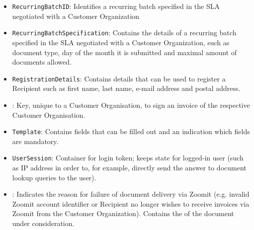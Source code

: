 \begin{itemize}
	\item \texttt{RecurringBatchID}: Identifies a recurring batch specified in the SLA negotiated with a Customer Organization
	\item \texttt{RecurringBatchSpecification}: Contains the details of a recurring batch specified in the SLA negotiated with a Customer Organization, such as document type, day of the month it is submitted and maximal amount of documents allowed.
	\item \texttt{RegistrationDetails}: Contains details that can be used to register a Recipient such as first name, last name, e-mail address and postal address.
	\item {}: Key, unique to a Customer Organisation, to sign an invoice of the respective Customer Organisation.
	\item \texttt{Template}: Contains fields that can be filled out and an indication which fields are mandatory.
	\item \texttt{UserSession}: Container for login token; keeps state for logged-in user (such as IP address in order to, for example, directly send the answer to document lookup queries to the user).
	\item {}: Indicates the reason for failure of document delivery via Zoomit (e.g. invalid Zoomit account identifier or Recipient no longer wishes to receive invoices via Zoomit from the Customer Organization). Contains the  of the document under consideration.
\end{itemize}